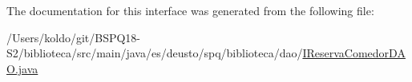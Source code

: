 The documentation for this interface was generated from the following file\+:\begin{DoxyCompactItemize}
\item 
/\+Users/koldo/git/\+B\+S\+P\+Q18-\/\+S2/biblioteca/src/main/java/es/deusto/spq/biblioteca/dao/\mbox{\hyperlink{_i_reserva_comedor_d_a_o_8java}{I\+Reserva\+Comedor\+D\+A\+O.\+java}}\end{DoxyCompactItemize}
